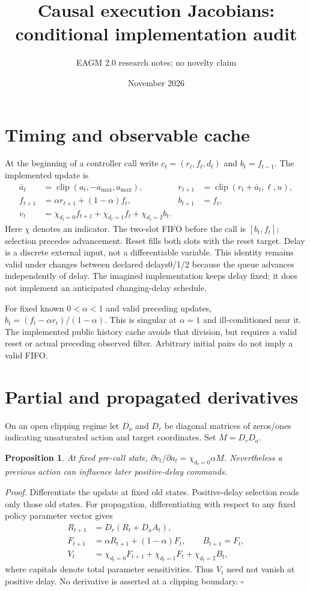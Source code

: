 \documentclass{article}
\title{Causal execution Jacobians: conditional implementation audit}
\author{EAGM 2.0 research notes; no novelty claim}
\date{November 2026}
\newtheorem{proposition}{Proposition}
\begin{document}
\maketitle
\section{Timing and observable cache}
At the beginning of a controller call write $c_t=(r_t,f_t,d_t)$ and $b_t=f_{t-1}$. The implemented update is
\begin{align}
\bar a_t&=\operatorname{clip}(a_t,-a_{\max},a_{\max}),&
r_{t+1}&=\operatorname{clip}(r_t+\bar a_t,\ell,u),\\
f_{t+1}&=\alpha r_{t+1}+(1-\alpha)f_t,& b_{t+1}&=f_t,\\
v_t&=\chi_{d_t=0}f_{t+1}+\chi_{d_t=1}f_t+\chi_{d_t=2}b_t.
\end{align}
Here $\chi$ denotes an indicator. The two-slot FIFO before the call is $[b_t,f_t]$; selection precedes advancement. Reset fills both slots with the reset target. Delay is a discrete external input, not a differentiable variable. This identity remains valid under changes between declared delays0/1/2 because the queue advances independently of delay. The imagined implementation keeps delay fixed; it does not implement an anticipated changing-delay schedule.

For fixed known $0<\alpha<1$ and valid preceding updates, $b_t=(f_t-\alpha r_t)/(1-\alpha)$. This is singular at $\alpha=1$ and ill-conditioned near it. The implemented public history cache avoids that division, but requires a valid reset or actual preceding observed filter. Arbitrary initial pairs do not imply a valid FIFO.

\section{Partial and propagated derivatives}
On an open clipping regime let $D_a$ and $D_r$ be diagonal matrices of zeros/ones indicating unsaturated action and target coordinates. Set $M=D_rD_a$.
\begin{proposition}
At fixed pre-call state, $\partial v_t/\partial a_t=\chi_{d_t=0}\alpha M$. Nevertheless a previous action can influence later positive-delay commands.
\end{proposition}
\noindent\textit{Proof.} Differentiate the update at fixed old states. Positive-delay selection reads only those old states. For propagation, differentiating with respect to any fixed policy parameter vector gives
\begin{align}
R_{t+1}&=D_r(R_t+D_a A_t),\\
F_{t+1}&=\alpha R_{t+1}+(1-\alpha)F_t,\qquad B_{t+1}=F_t,\\
V_t&=\chi_{d_t=0}F_{t+1}+\chi_{d_t=1}F_t+\chi_{d_t=2}B_t,
\end{align}
where capitals denote total parameter sensitivities. Thus $V_t$ need not vanish at positive delay. No derivative is asserted at a clipping boundary. $\square$
\end{document}
